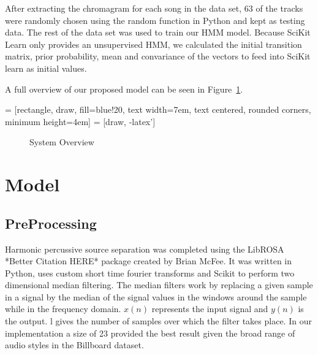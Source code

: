 \documentclass{article}
\begin{document}
After extracting the chromagram for each song in the data set, 63 of the tracks
were randomly chosen using the random function in Python and kept as testing
data. The rest of the data set was used to train our HMM model. Because SciKit
Learn only provides an unsupervised HMM, we calculated the initial transition
matrix, prior probability, mean and convariance of the vectors to feed into
SciKit learn as initial values.

A full overview of our proposed model can be seen in Figure~\ref{fig:overview}.

 = [rectangle, draw, fill=blue!20,
    text width=7em, text centered, rounded corners, minimum height=4em]
 = [draw, -latex']

\begin{figure}
\caption{System Overview}
\label{fig:overview}
\end{figure}

\section{Model}

\subsection{PreProcessing}

Harmonic percussive source separation was completed using the LibROSA *Better Citation HERE* package
created by Brian McFee. It was written in Python, uses custom short time
fourier transforms and Scikit to perform two dimensional median filtering. The
median filters work by replacing a given sample in a signal by the median of
the signal values in the windows around the sample \cite{FitzGerald:11} while
in the frequency domain. $ x(n) $ represents the input signal and $ y(n) $ is the
output. l gives the number of samples over which the filter takes place. In our
implementation a size of 23 provided the best result given the broad range of
audio styles in the Billboard dataset.
\end{document}

